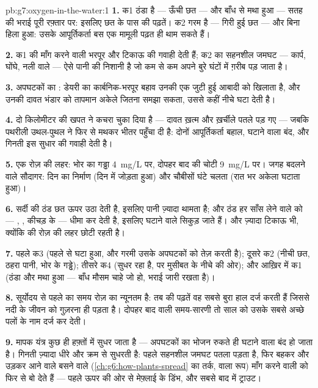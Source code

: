 \begin{solution}{pb:g7:oxygen-in-the-water:1}
\textbf{1.} क1 ठंडा है --- ऊँची छत --- और बाँध से मथा हुआ --- सतह की
भराई पूरी रफ़्तार पर: इसलिए छत के पास की पढ़तें। क2 गरम है --- गिरी हुई
छत --- और बिना हिला हुआ: उसके आपूर्तिकर्ता बस एक मामूली पढ़त ही थाम
सकते हैं।

\textbf{2.} क1 की माँग करने वाली  भरपूर और टिकाऊ  की
गवाही देती हैं; क2 का सहनशील जमघट --- कार्प, घोंघे, नली वाले --- ऐसे
पानी की निशानी है जो कम से कम अपने बुरे घंटों में ग़रीब पड़ जाता है।

\textbf{3.} अपघटकों का : डेयरी का कार्बनिक-भरपूर बहाव उनकी एक जुटी
हुई आबादी को खिलाता है, और उनकी दावत भंडार को तापमान अकेले जितना समझा
सकता, उससे कहीं नीचे घटा देती है।

\textbf{4.} दो किलोमीटर की खपत ने कचरा चुका दिया है --- दावत ख़त्म और
ख़र्चीले पतले पड़ गए --- जबकि पथरीली उथल-पुथल ने  फिर से मथकर
भीतर पहुँचा दी है: दोनों आपूर्तिकर्ता बहाल, घटाने वाला बंद, और गिनती इस
सुधार की गवाही देती है।

\textbf{5.} एक रोज़ की लहर: भोर का गड्ढा \qty{4}{mg/L} पर, दोपहर बाद की
चोटी \qty{9}{mg/L} पर। जगह बदलने वाले सौदागर: दिन का निर्माण (दिन में
जोड़ता हुआ) और चौबीसों घंटे चलता  (रात भर अकेला घटाता हुआ)।

\textbf{6.} सर्दी की ठंड छत ऊपर उठा देती है, इसलिए पानी ज़्यादा थामता
है; और ठंड हर साँस लेने वाले को --- , , कीचड़ के  ---
धीमा कर देती है, इसलिए घटाने वाले सिकुड़ जाते हैं। और ज़्यादा टिकाऊ भी,
क्योंकि  की रोज़ की लहर छोटी रहती है।

\textbf{7.} पहले क3 (पहले से घटा हुआ, और गरमी उसके अपघटकों को तेज़ करती
है); दूसरे क2 (नीची छत, ठहरा पानी, भोर के गड्ढे); तीसरे क4 (सुधर रहा है,
पर मुसीबत के नीचे की ओर); और आख़िर में क1 (ठंडा और मथा हुआ --- बाँध मौसम
चाहे जो हो, भराई जारी रखता है)।

\textbf{8.} सूर्योदय से पहले का समय रोज़ का न्यूनतम है: तब की पढ़तें वह
सबसे बुरा हाल दर्ज करती हैं जिससे नदी के जीवन को गुज़रना ही पड़ता है।
दोपहर बाद वाली समय-सारणी तो साल को उसके सबसे अच्छे पलों के नाम दर्ज कर
देती।

\textbf{9.} मापक यंत्र कुछ ही हफ़्तों में सुधर जाता है --- अपघटकों का
भोजन रुकते ही घटाने वाला बंद हो जाता है। गिनती ज़्यादा धीरे और क्रम से
सुधरती है: पहले सहनशील जमघट पतला पड़ता है, फिर बहकर और उड़कर आने वाले
बसने वाले (\cref{ch:g6:how-plants-spread} का तर्क,  वाला रूप)
माँग करने वाली  को फिर से बो देते हैं --- पहले ऊपर की ओर से
मेफ़्लाई के डिंभ, और सबसे बाद में ट्राउट।


\end{solution}
